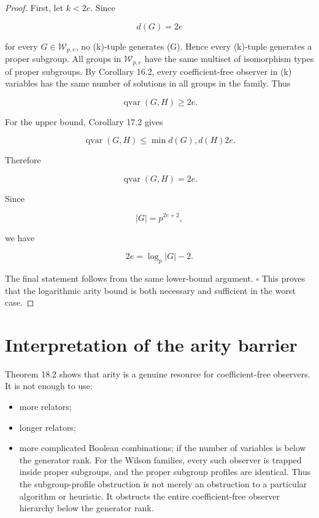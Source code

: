 \documentclass[11pt]{article}
\begin{document}
\begin{proof}
First, let $k<2e$. Since

\[
d(G)=2e
\]

for every $G\in\mathcal W_{p,e}$, no (k)-tuple generates (G). Hence every (k)-tuple generates a proper subgroup. All groups in $\mathcal W_{p,e}$ have the same multiset of isomorphism types of proper subgroups. By Corollary 16.2, every coefficient-free observer in (k) variables has the same number of solutions in all groups in the family. Thus

\[
\operatorname{qvar}(G,H)\ge 2e.
\]

For the upper bound, Corollary 17.2 gives

\[
\operatorname{qvar}(G,H)
\le
\min{d(G),d(H)}
2e.
\]

Therefore

\[
\operatorname{qvar}(G,H)=2e.
\]

Since

\[
|G|=p^{2e+2},
\]

we have

\[
2e=\log_p|G|-2.
\]

The final statement follows from the same lower-bound argument. $\square$ This proves that the logarithmic arity bound is both necessary and sufficient in the worst case.

\end{proof}

\section{Interpretation of the arity barrier}

Theorem 18.2 shows that arity is a genuine resource for coefficient-free observers. It is not enough to use:

\begin{itemize}
\item more relators;
\item longer relators;
\item more complicated Boolean combinations;
if the number of variables is below the generator rank. For the Wilson families, every such observer is trapped inside proper subgroups, and the proper subgroup profiles are identical. Thus the subgroup-profile obstruction is not merely an obstruction to a particular algorithm or heuristic. It obstructs the entire coefficient-free observer hierarchy below the generator rank.

\end{itemize}
\end{document}
